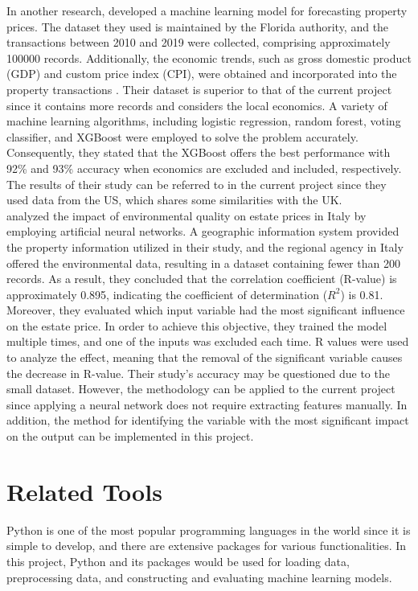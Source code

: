 \documentclass[12pt,twoside]{report}
\begin{document}
In another research, \citet{RN20} developed a machine learning model for forecasting property prices. The dataset they used is maintained by the Florida authority, and the transactions between 2010 and 2019 were collected, comprising approximately 100000 records. Additionally, the economic trends, such as gross domestic product (GDP) and custom price index (CPI), were obtained and incorporated into the property transactions \cite{RN20}. Their dataset is superior to that of the current project since it contains more records and considers the local economics. A variety of machine learning algorithms, including logistic regression, random forest, voting classifier, and XGBoost were employed to solve the problem accurately. Consequently, they stated that the XGBoost offers the best performance with 92\% and 93\% accuracy when economics are excluded and included, respectively. The results of their study can be referred to in the current project since they used data from the US, which shares some similarities with the UK.
\\

\citet{RN37} analyzed the impact of environmental quality on estate prices in Italy by employing artificial neural networks. A geographic information system provided the property information utilized in their study, and the regional agency in Italy offered the environmental data, resulting in a dataset containing fewer than 200 records. As a result, they concluded that the correlation coefficient (R-value) is approximately 0.895, indicating the coefficient of determination ($R^2$) is 0.81. Moreover, they evaluated which input variable had the most significant influence on the estate price. In order to achieve this objective, they trained the model multiple times, and one of the inputs was excluded each time. R values were used to analyze the effect, meaning that the removal of the significant variable causes the decrease in R-value. Their study's accuracy may be questioned due to the small dataset. However, the methodology can be applied to the current project since applying a neural network does not require extracting features manually. In addition, the method for identifying the variable with the most significant impact on the output can be implemented in this project.

\section{Related Tools}
Python is one of the most popular programming languages in the world since it is simple to develop, and there are extensive packages for various functionalities. In this project, Python and its packages would be used for loading data, preprocessing data, and constructing and evaluating machine learning models. 
\end{document}
